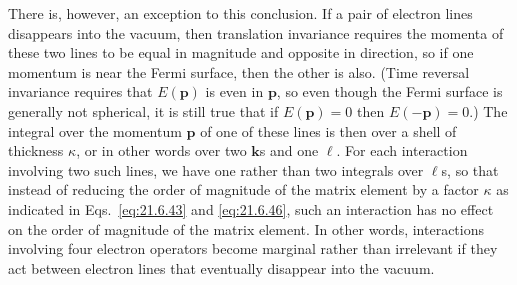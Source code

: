 There is, however, an exception to this conclusion. If a pair of electron lines disappears into the vacuum, then translation invariance requires the momenta of these two lines to be equal in magnitude and opposite in direction, so if one momentum is near the Fermi surface, then the other is also. (Time reversal invariance requires that $E(\mathbf p)$ is even in $\mathbf p$, so even though the Fermi surface is generally not spherical, it is still true that if $E(\mathbf p)=0$ then $E(-\mathbf p)=0$.) The integral over the momentum $\mathbf p$ of one of these lines is then over a shell of thickness $\kappa$, or in other words over two $\mathbf k$s and one $\ell$. For each interaction involving two such lines, we have one rather than two integrals over $\ell$s, so that instead of reducing the order of magnitude of the matrix element by a factor $\kappa$ as indicated in Eqs.~\eqref{eq:21.6.43} and \eqref{eq:21.6.46}, such an interaction has no effect on the order of magnitude of the matrix element. In other words, interactions involving four electron operators become marginal rather than irrelevant if they act between electron lines that eventually disappear into the vacuum.

